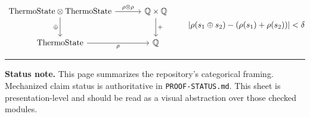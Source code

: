 \documentclass[10pt, a4paper]{article}
\newcommand{\TS}{\mathrm{ThermoState}}
\begin{document}
\[
\begin{tikzcd}[column sep=3.2em, row sep=2.3em]
\TS \otimes \TS
  \arrow[r, "\rho \otimes \rho"]
  \arrow[d, "\oplus"']
& \mathbb{Q} \times \mathbb{Q}
  \arrow[d, "{+}"]
\\
\TS
  \arrow[r, "\rho"']
& \mathbb{Q}
\end{tikzcd}
\qquad
\left|\rho(s_1 \oplus s_2)-(\rho(s_1)+\rho(s_2))\right| < \delta
\]

\vspace{0.1em}
{\color{Black}\rule{\textwidth}{0.8pt}}
\vspace{0.2em}

\noindent\textbf{Status note.}
This page summarizes the repository's categorical framing. Mechanized claim status is
authoritative in \texttt{PROOF\allowbreak-STATUS.md}. This sheet is presentation-level and should
be read as a visual abstraction over those checked modules.
\end{document}
